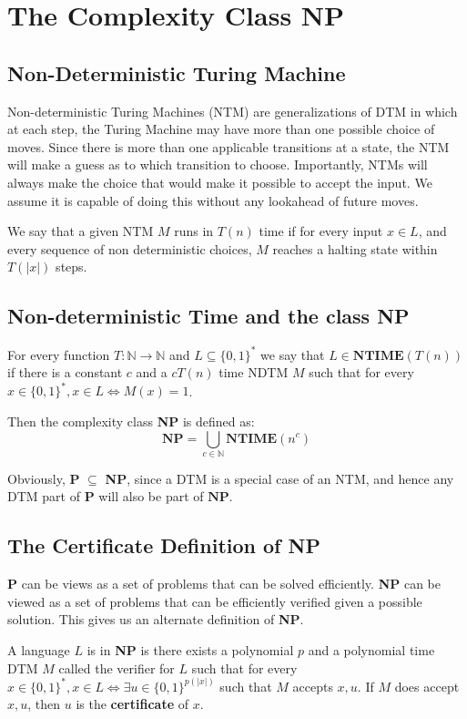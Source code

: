 \documentclass[12pt,letterpaper]{article}
\theoremstyle{definition}
\newcommand{\N}{\mathbb{N}}
\begin{document}
\section{The Complexity Class NP}

\subsection{Non-Deterministic Turing Machine}

Non-deterministic Turing Machines (NTM) are generalizations of DTM in which at each step, the Turing Machine may have more than one possible choice of moves. Since there is more than one applicable transitions at a state, the NTM will make a guess as to which transition to choose. Importantly, NTMs will always make the choice that would make it possible to accept the input. We assume it is capable of doing this without any lookahead of future moves.

We say that a given NTM $M$ runs in $T(n)$ time if for every input $x \in L$,  and every sequence of non deterministic choices, $M$ reaches a halting state within $T(|x|)$ steps.

\subsection{Non-deterministic Time and the class NP}

For every function $T : \N \rightarrow \N$ and $L \subseteq \{0,1\}^*$ we say that $L \in \mathbf{NTIME}(T(n))$ if there is a constant $c$ and a $cT(n)$ time NDTM $M$ such that for every $x \in \{0,1\}^*, x \in L \Leftrightarrow M(x) = 1$.

Then the complexity class \textbf{NP} is defined as:
\[\mathbf{NP} = \bigcup_{c \in \N} \mathbf{NTIME}(n^c)\]

Obviously, \textbf{P} $\subseteq$ \textbf{NP}, since a DTM is a special case of an NTM, and hence any DTM part of $\mathbf{P}$ will also be part of $\mathbf{NP}$.

\subsection{The Certificate Definition of NP}
\textbf{P} can be views as a set of problems that can be solved efficiently. \textbf{NP} can be viewed as a set of problems that can be efficiently verified given a possible solution. This gives us an alternate definition of \textbf{NP}.

A language $L$ is in \textbf{NP} is there exists a polynomial $p$ and a polynomial time DTM $M$ called the verifier for $L$ such that for every $x \in \{0,1\}^*, x \in L \Leftrightarrow \exists u \in \{0,1\}^{p(|x|)}$ such that $M$ accepts $x,u$. If $M$ does accept $x,u$, then $u$ is the \textbf{certificate} of $x$.
\end{document}
